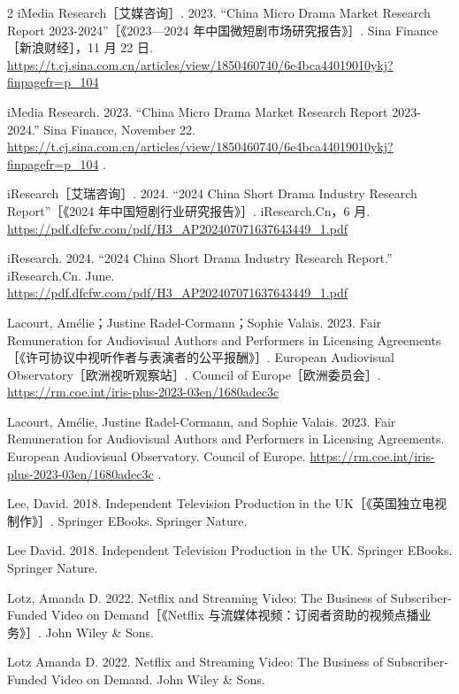 \documentclass[10pt,a4paper]{article}
\begin{document}
\begin{paracol}{2}
\switchcolumn*
iMedia Research［艾媒咨询］. 2023. “China Micro Drama Market Research Report 2023-2024”［《2023—2024 年中国微短剧市场研究报告》］. Sina Finance［新浪财经］，11 月 22 日. \url{https://t.cj.sina.com.cn/articles/view/1850460740/6e4bca44019010ykj?finpagefr=p_104}\par
\switchcolumn
iMedia Research. 2023. “China Micro Drama Market Research Report 2023-2024.” Sina Finance, November 22. \url{https://t.cj.sina.com.cn/articles/view/1850460740/6e4bca44019010ykj?finpagefr=p_104} .\par
\switchcolumn*
iResearch［艾瑞咨询］. 2024. “2024 China Short Drama Industry Research Report”［《2024 年中国短剧行业研究报告》］. iResearch.Cn，6 月. \url{https://pdf.dfcfw.com/pdf/H3_AP202407071637643449_1.pdf}\par
\switchcolumn
iResearch. 2024. “2024 China Short Drama Industry Research Report.” iResearch.Cn. June. \url{https://pdf.dfcfw.com/pdf/H3_AP202407071637643449_1.pdf}\par
\switchcolumn*
Lacourt, Amélie；Justine Radel-Cormann；Sophie Valais. 2023. Fair Remuneration for Audiovisual Authors and Performers in Licensing Agreements［《许可协议中视听作者与表演者的公平报酬》］. European Audiovisual Observatory［欧洲视听观察站］. Council of Europe［欧洲委员会］. \url{https://rm.coe.int/iris-plus-2023-03en/1680adec3c}\par
\switchcolumn
Lacourt, Amélie, Justine Radel-Cormann, and Sophie Valais. 2023. Fair Remuneration for Audiovisual Authors and Performers in Licensing Agreements. European Audiovisual Observatory. Council of Europe. \url{https://rm.coe.int/iris-plus-2023-03en/1680adec3c} .\par
\switchcolumn*
Lee, David. 2018. Independent Television Production in the UK［《英国独立电视制作》］. Springer EBooks. Springer Nature.\par
\switchcolumn
Lee David. 2018. Independent Television Production in the UK. Springer EBooks. Springer Nature.\par
\switchcolumn*
Lotz, Amanda D. 2022. Netflix and Streaming Video: The Business of Subscriber-Funded Video on Demand［《Netflix 与流媒体视频：订阅者资助的视频点播业务》］. John Wiley \& Sons.\par
\switchcolumn
Lotz Amanda D. 2022. Netflix and Streaming Video: The Business of Subscriber-Funded Video on Demand. John Wiley \& Sons.\par
\switchcolumn*

\end{paracol}
\end{document}

